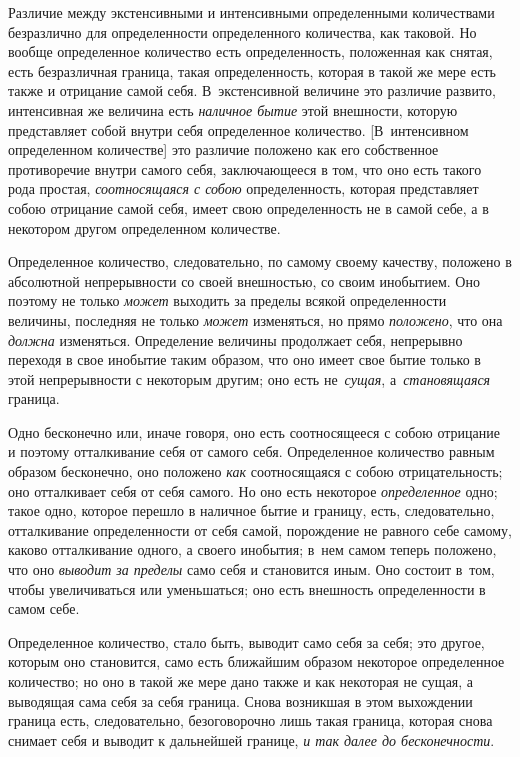 Различие между экстенсивными и интенсивными определенными количествами
безразлично для определенности определенного количества, как таковой. Но вообще
определенное количество есть определенность, положенная как снятая, есть
безразличная граница, такая определенность, которая в такой же мере есть также
и отрицание самой себя. В~экстенсивной величине это различие развито,
интенсивная же величина есть {\em наличное бытие} этой внешности, которую
представляет собой внутри себя определенное количество. [В~интенсивном
определенном количестве] это различие положено как его собственное противоречие
внутри самого себя, заключающееся в том, что оно есть такого рода простая,
{\em соотносящаяся с собою} определенность, которая представляет собою
отрицание самой себя, имеет свою определенность не в самой себе, а в некотором другом
определенном количестве.

Определенное количество, следовательно, по самому своему качеству, положено
в абсолютной непрерывности со своей внешностью, со своим инобытием. Оно поэтому
не только {\em может} выходить за пределы всякой определенности величины,
последняя не только {\em может} изменяться, но прямо {\em положено}, что она
{\em должна} изменяться. Определение величины продолжает себя,
непрерывно переходя в свое инобытие таким образом, что оно имеет свое бытие
только в этой непрерывности с некоторым другим; оно есть не~{\em сущая},
а~{\em становящаяся} граница.

Одно бесконечно или, иначе говоря, оно есть соотносящееся с собою отрицание и
поэтому отталкивание себя от самого себя. Определенное количество равным
образом бесконечно, оно положено {\em как} соотносящаяся с собою отрицательность; оно
отталкивает себя от себя самого. Но оно есть некоторое {\em определенное} одно;
такое одно, которое перешло в наличное бытие и границу, есть, следовательно,
отталкивание определенности от себя самой, порождение не равного себе самому,
каково отталкивание одного, а своего инобытия; в~нем самом теперь положено, что
оно {\em выводит за пределы} само себя и становится иным. Оно состоит в~том, чтобы
увеличиваться или уменьшаться; оно есть внешность определенности в самом себе.

Определенное количество, стало быть, выводит само себя за себя; это другое,
которым оно становится, само есть ближайшим образом некоторое определенное
количество; но оно в такой же мере дано также и как некоторая не сущая, а
выводящая сама себя за себя граница. Снова возникшая в этом выхождении граница
есть, следовательно, безоговорочно лишь такая граница, которая снова снимает
себя и выводит к дальнейшей границе, {\em и так далее до бесконечности}.

